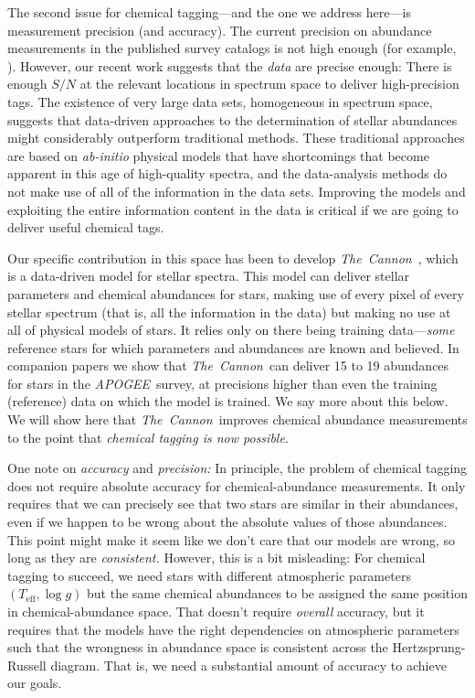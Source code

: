 \documentclass[manuscript, letterpaper]{aastex6}
\newcommand{\acronym}[1]{{\small{#1}}}
\newcommand{\project}[1]{\textsl{#1}}
\newcommand{\apogee}{\project{\acronym{APOGEE}}}
\newcommand{\thecannon}{\project{The~Cannon}}
\newcommand{\foreign}[1]{\textsl{#1}}
\newcommand{\teff}{T_{\mathrm{eff}}}
\newcommand{\logg}{\log g}
\begin{document}
The second issue for chemical tagging---and the one we address
here---is measurement precision (and accuracy).
The current precision on abundance measurements in the published
survey catalogs is not high enough (for example, \citealt{martell, ting}).
However, our recent work \citep{thecannon} suggests that the \emph{data}
are precise enough: There is enough $S/N$ at the relevant
locations in spectrum space to deliver high-precision tags.
The existence of very large data sets, homogeneous in spectrum
space, suggests that data-driven approaches to the determination
of stellar abundances might considerably outperform traditional
methods.
These traditional approaches are based on \foreign{ab-initio} physical models
that have shortcomings that become apparent in this age of
high-quality spectra, and the data-analysis methods do not make use of
all of the information in the data sets.
Improving the models and exploiting the entire information
content in the data is critical if we are going to deliver useful
chemical tags.

Our specific contribution in this space has been to develop
\thecannon\ \citep{thecannon, ages}, which is a data-driven model for
stellar spectra.
This model can deliver stellar parameters and chemical abundances for
stars, making use of every pixel of every stellar spectrum (that is,
all the information in the data) but making no use at all of physical
models of stars.
It relies only on there being training data---\emph{some} reference stars for
which parameters and abundances are known and believed.
In companion papers \citep{casey16, ness16} we show that
\thecannon\ can deliver 15 to 19 abundances for stars in the
\apogee\ survey, at precisions higher than even the training (reference) data on
which the model is trained.
We say more about this below.
We will show here that \thecannon\ improves chemical abundance measurements
to the point that \emph{chemical tagging is now possible.}

One note on \emph{accuracy} and \emph{precision:}
In principle, the problem of chemical tagging does not require
absolute accuracy for chemical-abundance measurements.
It only requires that we can precisely see that two stars are similar
in their abundances, even if we happen to be wrong about the absolute values of
those abundances.
This point might make it seem like we don't care that our models are
wrong, so long as they are \emph{consistent.}
However, this is a bit misleading:
For chemical tagging to succeed, we need stars with different
atmospheric parameters $(\teff, \logg)$ but the same chemical
abundances to be assigned the same position in chemical-abundance
space.
That doesn't require \emph{overall} accuracy, but it requires that the models
have the right dependencies on atmospheric parameters such that the
wrongness in abundance space is consistent across the Hertzsprung-Russell diagram.
That is, we need a substantial amount of accuracy to achieve our goals.
\end{document}
